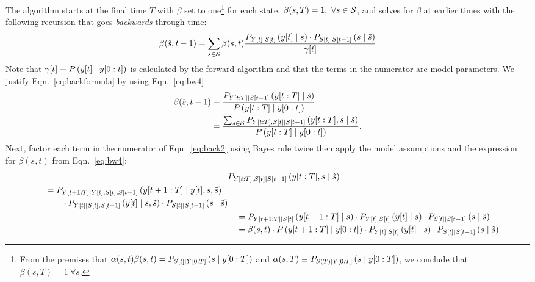 The algorithm starts at the final time $T$ with $\beta$ set to
one\footnote{From the premises that $\alpha(s,t) \beta(s,t) =
  P_{{S}{[t]}\mid Y[0:T]} \left(s\mid y[0:T] \right)$ and
  $\alpha(s,T) \equiv P_{S(T)\mid Y[0:T]}\left(s \mid y[0:T]
  \right)$, we conclude that $\beta(s,T) = 1 ~\forall s$.} %
for each state, $\beta(s,T) = 1,~\forall s \in \states$, and solves
for $\beta$ at earlier times with the following recursion that goes
\emph{backwards} through time:
\begin{equation}
  \label{eq:backformula}
  \beta({\tilde s},t-1) = \sum_{s\in\states} \beta(s,t)
  \frac{ P_{\ti{Y}{t}\given \ti{S}{t}}
    \left(\ti{y}{t}\given s \right) \cdot P_{\ti{S}{t}\given \ti{S}{t-1}}
    \left(s\given {\tilde s} \right)} {\ti{\gamma}{t}}
\end{equation}
Note that ${{\gamma}{[t]} \equiv P \left( {y}{[t]} \mid 
    y[0:t]\right)}$ is calculated by the forward algorithm and
that the terms in the numerator are model parameters.  We justify
Eqn.~\eqref{eq:backformula} by using Eqn.~\eqref{eq:bw4}
\begin{align}
  \beta({\tilde s},t-1) & \equiv \frac{P_{\ts{Y}{t}{T}\given \ti{S}{t-1}}
    \left(\ts{y}{t}{T}\given {\tilde s} \right)}
  {P \left(\ts{y}{t}{T}\given \ts{y}{0}{t} \right)} \\
  \mlabel{eq:back2}
  &= \frac{\sum_{s\in\states} P_{\ts{Y}{t}{T},\ti{S}{t}\given \ti{S}{t-1}}
    \left(\ts{y}{t}{T},s\given {\tilde s} \right)} {P
    \left(\ts{y}{t}{T}\given \ts{y}{0}{t} \right)}.
\end{align}
Next, factor each term in the numerator of Eqn.~\eqref{eq:back2} using
Bayes rule twice then apply the model assumptions and the expression
for $\beta(s,t)$ from Eqn.~\eqref{eq:bw4}:
\begin{align*}
  & P_{Y[t:T],{S}{[t]}\mid {S}{[t-1]}}\left( y[t:T],s\mid {\tilde s} \right)\\
  \begin{split}
    &\quad= P_{Y[t+1:T]\mid {Y}{[t]},{S}{[t]},{S}{[t-1]}}
       \left(y[t+1:T]\mid {y}{[t]},s,{\tilde s} \right)\\
    &\quad\qquad \cdot P_{{Y}{[t]}\mid {S}{[t]},{S}{[t-1]}} \left({y}{[t]}\mid s,{\tilde s}
       \right)\cdot P_{{S}{[t]}\mid {S}{[t-1]}} \left(s\mid {\tilde s} \right)
  \end{split}\\
  &\quad= P_{Y[t+1:T]\mid {S}{[t]}} \left(y[t+1:T]\mid s\right)
           \cdot P_{{Y}{[t]}\mid {S}{[t]}} \left({y}{[t]}\mid s \right) \cdot
            P_{{S}{[t]}\mid {S}{[t-1]}} \left(s\mid {\tilde s} \right) \\
  &\quad= \beta(s,t) \cdot P \left(y[t+1:T]\mid y[0:t] \right)
           \cdot P_{{Y}{[t]}\mid {S}{[t]}} \left({y}{[t]}\mid s \right) \cdot
            P_{{S}{[t]}\mid {S}{[t-1]}} \left(s\mid {\tilde s} \right)
\end{align*}
